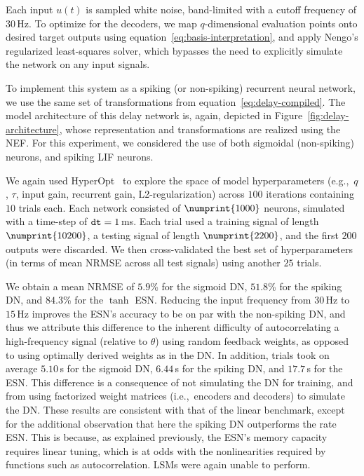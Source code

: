 Each input $u(t)$ is sampled white noise, band-limited with a cutoff frequency of $30$\,Hz.
To optimize for the decoders, we map $q$-dimensional evaluation points onto desired target outputs using equation~\ref{eq:basis-interpretation}, and apply Nengo's regularized least-squares solver, which bypasses the need to explicitly simulate the network on any input signals.

To implement this system as a spiking (or non-spiking) recurrent neural network, we use the same set of transformations from equation~\ref{eq:delay-compiled}. %
The model architecture of this delay network is, again, depicted in Figure~\ref{fig:delay-architecture}, whose representation and transformations are realized using the NEF.
For this experiment, we considered the use of both sigmoidal (non-spiking) neurons, and spiking LIF neurons.

We again used HyperOpt~\citep{bergstra2015hyperopt} to explore the space of model hyperparameters (e.g.,~$q$, $\tau$, input gain, recurrent gain, L2-regularization) across $100$ iterations containing $10$ trials each.
Each network consisted of $\numprint{1000}$ neurons, simulated with a time-step of $\texttt{dt}{} = 1$\,ms.
Each trial used a training signal of length $\numprint{10200}$, a testing signal of length $\numprint{2200}$, and the first $200$ outputs were discarded.
We then cross-validated the best set of hyperparameters (in terms of mean NRMSE across all test signals) using another $25$ trials.

We obtain a mean NRMSE of $5.9$\% for the sigmoid DN, $51.8$\% for the spiking DN, and $84.3$\% for the $\tanh$ ESN.
Reducing the input frequency from $30$\,Hz to $15$\,Hz improves the ESN's accuracy to be on par with the non-spiking DN, and thus we attribute this difference to the inherent difficulty of autocorrelating a high-frequency signal (relative to $\theta$) using random feedback weights, as opposed to using optimally derived weights as in the DN.
In addition, trials took on average $5.10$\,s for the sigmoid DN, $6.44$\,s for the spiking DN, and $17.7$\,s for the ESN.
This difference is a consequence of not simulating the DN for training, and from using factorized weight matrices (i.e.,~encoders and decoders) to simulate the DN.
These results are consistent with that of the linear benchmark, except for the additional observation that here the spiking DN outperforms the rate ESN.
This is because, as explained previously, the ESN's memory capacity requires linear tuning, which is at odds with the nonlinearities required by functions such as autocorrelation.
LSMs were again unable to perform.

